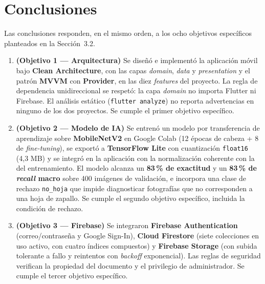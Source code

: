 \documentclass[12pt,a4paper]{article}
\begin{document}
\section{Conclusiones}

Las conclusiones responden, en el mismo orden, a los ocho objetivos específicos
planteados en la Sección~3.2.

\begin{enumerate}
  \item \textbf{(Objetivo 1 --- Arquitectura)} Se diseñó e implementó la
        aplicación móvil bajo \textbf{Clean Architecture}, con las capas
        \textit{domain}, \textit{data} y \textit{presentation} y el patrón
        \textbf{MVVM} con \textbf{Provider}, en las diez \textit{features} del
        proyecto. La regla de dependencia unidireccional se respetó: la capa
        \textit{domain} no importa Flutter ni Firebase. El análisis estático
        (\texttt{flutter analyze}) no reporta advertencias en ninguno de los dos
        proyectos. Se cumple el primer objetivo específico.

  \item \textbf{(Objetivo 2 --- Modelo de IA)} Se entrenó un modelo por
        transferencia de aprendizaje sobre \textbf{MobileNetV2} en Google Colab
        (12 épocas de cabeza + 8 de \textit{fine-tuning}), se exportó a
        \textbf{TensorFlow Lite} con cuantización \texttt{float16} (4{,}3 MB) y se
        integró en la aplicación con la normalización coherente con la del
        entrenamiento. El modelo alcanza un \textbf{83\,\% de exactitud} y un
        \textbf{83\,\% de \textit{recall} macro} sobre 400 imágenes de
        validación, e incorpora una clase de rechazo \texttt{no\_hoja} que impide
        diagnosticar fotografías que no corresponden a una hoja de zapallo. Se
        cumple el segundo objetivo específico, incluida la condición de rechazo.

  \item \textbf{(Objetivo 3 --- Firebase)} Se integraron \textbf{Firebase
        Authentication} (correo/contraseña y Google Sign-In), \textbf{Cloud
        Firestore} (siete colecciones en uso activo, con cuatro índices
        compuestos) y \textbf{Firebase Storage} (con subida tolerante a fallo y
        reintentos con \textit{backoff} exponencial). Las reglas de seguridad
        verifican la propiedad del documento y el privilegio de administrador. Se
        cumple el tercer objetivo específico.


\end{enumerate}
\end{document}
